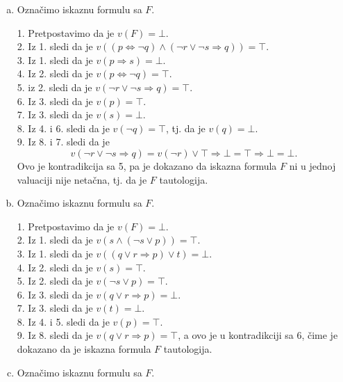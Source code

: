 \begin{enumerate}[(a)]
\item Ozna\v cimo iskaznu formulu sa $F$.

1. Pretpostavimo da je $v(F)=\bot$.\\
2. Iz 1. sledi da je $v((p\Leftrightarrow \neg q)\wedge(\neg r\vee \neg s\Rightarrow q))=\top$.\\
3. Iz 1. sledi da je $v(p\Rightarrow s)=\bot$.\\
4. Iz 2. sledi da je $v(p\Leftrightarrow \neg q)=\top$.\\
5. iz 2. sledi da je $v(\neg r\vee \neg s\Rightarrow q)=\top$.\\
6. Iz 3. sledi da je $v(p)=\top$.\\
7. Iz 3. sledi da je $v(s)=\bot$.\\
8. Iz 4. i 6. sledi da je $v(\neg q)=\top$, tj. da je $v(q)=\bot$.\\
9. Iz 8. i 7. sledi da je
\[v(\neg r\vee \neg s\Rightarrow q)=v(\neg r)\vee \top\Rightarrow \bot=\top\Rightarrow \bot=\bot.\]
Ovo je kontradikcija sa 5, pa je dokazano da iskazna formula $F$ ni u  jednoj valuaciji nije neta\v cna, tj. da je $F$ tautologija.

\item Ozna\v cimo iskaznu formulu sa $F$.

1. Pretpostavimo da je $v(F)=\bot$.\\
2. Iz 1. sledi da je $v(s\wedge(\neg s\vee p))=\top$.\\
3. Iz 1. sledi da je $v((q\vee r\Rightarrow p)\vee t)=\bot$.\\
4. Iz 2. sledi da je $v(s)=\top$.\\
5. Iz 2. sledi da je $v(\neg s\vee p)=\top$.\\
6. Iz 3. sledi da je $v(q\vee r\Rightarrow p)=\bot$.\\
7. Iz 3. sledi da je $v(t)=\bot$.\\
8. Iz 4. i 5. sledi da je $v(p)=\top$.\\
9. Iz 8. sledi da je $v(q\vee r\Rightarrow p)=\top$, a ovo je u kontradikciji sa 6, \v cime je dokazano da je iskazna formula $F$ tautologija.

\item Ozna\v cimo iskaznu formulu sa $F$.


\end{enumerate}
